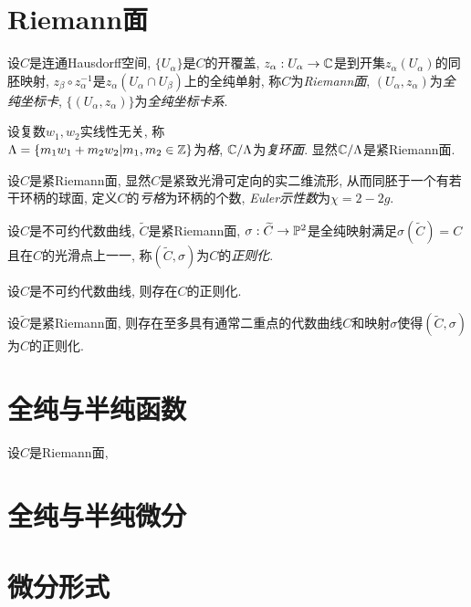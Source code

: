 \section{Riemann面}\label{s1-2}
\begin{definition}
    设$C$是连通Hausdorff空间, $\{U_\alpha\}$是$C$的开覆盖, $z_\alpha:U_\alpha\to\C$是到开集$z_\alpha(U_\alpha)$的同胚映射, $z_\beta\circ z_\alpha^{-1}$是$z_\alpha(U_\alpha\cap U_\beta)$上的全纯单射, 称$C$为\textit{Riemann面}, $(U_\alpha,z_\alpha)$为\textit{全纯坐标卡}, $\{(U_\alpha,z_\alpha)\}$为\textit{全纯坐标卡系}. 
\end{definition}
\begin{definition}
    设复数$w_1,w_2$实线性无关, 称\\
    $\Lambda=\{m_1w_1+m_2w_2|m_1,m_2\in\Z\}$为\textit{格}, 
    $\C/\Lambda$为\textit{复环面}. 显然$\C/\Lambda$是紧Riemann面. 
\end{definition}
\begin{definition}
    设$C$是紧Riemann面, 显然$C$是紧致光滑可定向的实二维流形, 从而同胚于一个有若干环柄的球面, 定义$C$的\textit{亏格}为环柄的个数, \textit{Euler示性数}为$\chi=2-2g$. 
\end{definition}
\begin{definition}
    设$C$是不可约代数曲线, $\widetilde{C}$是紧Riemann面, $\sigma:\widetilde{C}\to\P^2$是全纯映射满足$\sigma(\widetilde{C})=C$且在$C$的光滑点上一一, 称$(\widetilde{C},\sigma)$为$C$的\textit{正则化}. 
\end{definition}
\begin{theorem}
    设$C$是不可约代数曲线, 则存在$C$的正则化. 
\end{theorem}
\begin{theorem}
    设$\widetilde{C}$是紧Riemann面, 则存在至多具有通常二重点的代数曲线$C$和映射$\sigma$使得$(\widetilde{C},\sigma)$为$C$的正则化. 
\end{theorem}

\section{全纯与半纯函数}\label{s1-3}
\begin{definition}
    设$C$是Riemann面, 
\end{definition}
\section{全纯与半纯微分}\label{s1-4}

\section{微分形式}\label{s1-5}

